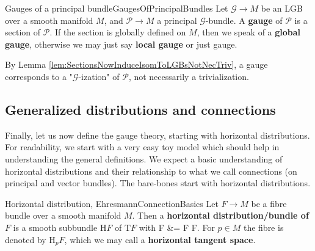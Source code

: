 \documentclass[a4paper,oneside,11pt,bibliography=totoc]{scrartcl}
\def\bas#1\eas{\begin{align*}#1\end{align*}}
\theoremstyle{plain}
\theoremstyle{remark}
\theoremstyle{definition}
\begin{document}
\begin{definitions}{Gauges of a principal bundle}{GaugesOfPrincipalBundles}
Let $\mathcal{G} \to M$ be an LGB over a smooth manifold $M$, and $\mathcal{P} \to M$ a principal $\mathcal{G}$-bundle. A \textbf{gauge} of $\mathcal{P}$ is a section of $\mathcal{P}$. If the section is globally defined on $M$, then we speak of a \textbf{global gauge}, otherwise we may just say \textbf{local gauge} or just gauge.
\end{definitions}

By Lemma \ref{lem:SectionsNowInduceIsomToLGBsNotNecTriv}, a gauge corresponds to a "$\mathcal{G}$-ization" of $\mathcal{P}$, not necessarily a trivialization.

\subsection{Generalized distributions and connections}

Finally, let us now define the gauge theory, starting with horizontal distributions. For readability, we start with a very easy toy model which should help in understanding the general definitions. We expect a basic understanding of horizontal distributions and their relationship to what we call connections (on principal and vector bundles). The bare-bones start with horizontal distributions.

\begin{definitions}{Horizontal distribution, \newline \cite[\S 5.1.2, Def.\ 5.1.6, page 260; without the symmetry along right-translations here]{Hamilton}}{EhresmannConnectionBasics}
Let $F \to M$ be a fibre bundle over a smooth manifold $M$. Then a \textbf{horizontal distribution/bundle of $F$} is a smooth subbundle $\mathrm{H}F$ of $\mathrm{T}F$ with
\bas
\mathrm{T}F
&=
F \oplus {}F.
\eas
For $p \in M$ the fibre is denoted by $\mathrm{H}_p F$, which we may call a \textbf{horizontal tangent space}.
\end{definitions}
\end{document}
